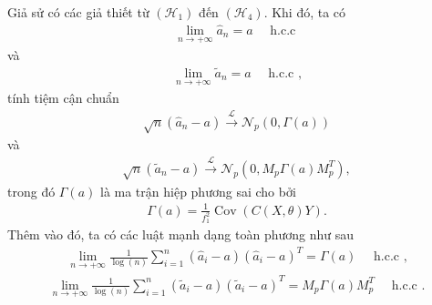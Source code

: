 {\dl Giả sử có các giả thiết từ $\left(\mathcal{H}_{1}\right)$ đến $\left(\mathcal{H}_{4}\right)$. Khi đó, ta có
\begin{align}
    \lim _{n \rightarrow+\infty} \widehat{a}_{n}=a \quad \text { h.c.c }
    \label{5.7}
\end{align}
và
\begin{align}
    \lim _{n \rightarrow+\infty} \widetilde{a}_{n}=a \quad \text { h.c.c ,}
    \label{5.8}
\end{align}
tính tiệm cận chuẩn
\begin{align}
    \sqrt{n}\left(\widehat{a}_{n}-a\right) \stackrel{\mathcal{L}}{\longrightarrow} \mathcal{N}_{p}(0, \Gamma(a))
    \label{5.9}
\end{align}
và
\begin{align}
    \sqrt{n}\left(\widetilde{a}_{n}-a\right) \stackrel{\mathcal{L}}{\longrightarrow} \mathcal{N}_{p}\left(0, M_{p} \Gamma(a) M_{p}^{T}\right),
    \label{5.10}
\end{align}
trong đó $\Gamma(a)$ là ma trận hiệp phương sai cho bởi
\begin{align}
    \Gamma(a)=\frac{1}{f_{1}^{2}} \operatorname{Cov}(C(X, \theta) Y).
    \label{5.11}
\end{align}
Thêm vào đó, ta có các luật mạnh dạng toàn phương như sau
\begin{align}
    \lim _{n \rightarrow+\infty} \frac{1}{\log (n)} \sum_{i=1}^{n}\left(\widehat{a}_{i}-a\right)\left(\widehat{a}_{i}-a\right)^{T}=\Gamma(a) \quad \text { h.c.c ,}
    \label{5.12}
\end{align}
\begin{align}
    \lim _{n \rightarrow+\infty} \frac{1}{\log (n)} \sum_{i=1}^{n}\left(\widetilde{a}_{i}-a\right)\left(\widetilde{a}_{i}-a\right)^{T}=M_{p} \Gamma(a) M_{p}^{T} \quad \text { h.c.c .}
    \label{5.13}
\end{align}
}
